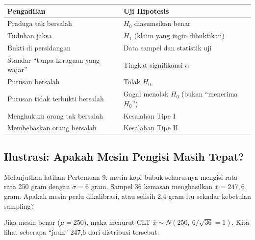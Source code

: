 \documentclass[
  indonesian,
  letterpaper,
]{book}
\newcounter{none} %
\begin{document}
{\def\LTcaptype{none} %
\begin{longtable}[]{@{}
  >{\raggedright\arraybackslash}p{}
  >{\raggedright\arraybackslash}p{}@{}}
\toprule\noalign{}
\begin{minipage}[b]{\linewidth}\raggedright
Pengadilan
\end{minipage} & \begin{minipage}[b]{\linewidth}\raggedright
Uji Hipotesis
\end{minipage} \\
\midrule\noalign{}
\endhead
\bottomrule\noalign{}
\endlastfoot
Praduga tak bersalah & \(H_0\) diasumsikan benar \\
Tuduhan jaksa & \(H_1\) (klaim yang ingin dibuktikan) \\
Bukti di persidangan & Data sampel dan statistik uji \\
Standar ``tanpa keraguan yang wajar'' & Tingkat signifikansi
\(\alpha\) \\
Putusan bersalah & Tolak \(H_0\) \\
Putusan tidak terbukti bersalah & Gagal menolak \(H_0\) (bukan
``menerima \(H_0\)'') \\
Menghukum orang tak bersalah & Kesalahan Tipe I \\
Membebaskan orang bersalah & Kesalahan Tipe II \\
\end{longtable}
}

\subsection{Ilustrasi: Apakah Mesin Pengisi Masih
Tepat?}\label{ilustrasi-apakah-mesin-pengisi-masih-tepat}

Melanjutkan latihan Pertemuan 9: mesin kopi bubuk seharusnya mengisi
rata-rata 250 gram dengan \(\sigma = 6\) gram. Sampel 36 kemasan
menghasilkan \(\bar{x} = 247{,}6\) gram. Apakah mesin perlu dikalibrasi,
atau selisih 2,4 gram itu sekadar kebetulan sampling?

Jika mesin benar (\(\mu = 250\)), maka menurut CLT
\(\bar{x} \sim N(250,\ 6/\sqrt{36} = 1)\). Kita lihat seberapa ``jauh''
247,6 dari distribusi tersebut:
\end{document}
